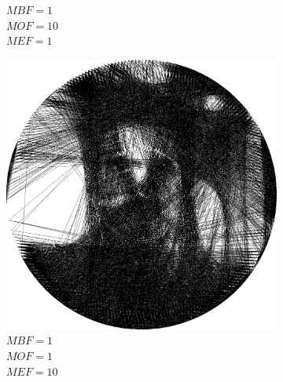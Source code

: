 \documentclass[a4paper, 12pt, polish, twoside]{extreport}
\begin{document}
\begin{figure}[H]
\begin{subfigure}{0.32\textwidth}
        \caption{\(MBF = 1\) \\ \(MOF = 10\) \\ \(MEF = 1\)}
        \label{mine-param-taco-thread-e}
    \end{subfigure}
    \begin{subfigure}{0.32\textwidth}
        \centering
        \includegraphics[width = \textwidth]{img/4-mine/taco-thread/taco_e_i3000_c20_inv0_bg1_obj1_ed10.png}
        \caption{\(MBF = 1\) \\ \(MOF = 1\) \\ \(MEF = 10\)}
        \label{mine-param-taco-thread-f}
    \end{subfigure}\\
    \begin{subfigure}{0.32\textwidth}
        \centering

\end{subfigure}
\end{figure}
\end{document}
